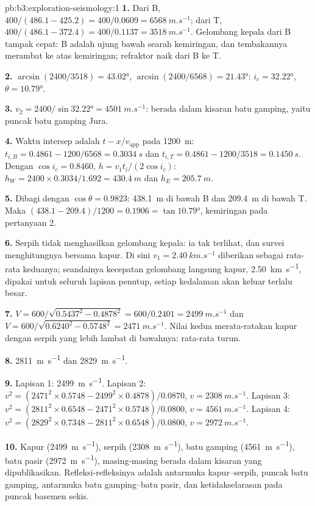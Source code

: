 \begin{solution}{pb:b3:exploration-seismology:1}
\textbf{1.} Dari B, $400/(486.1 - 425.2) = 400/0.0609 = \qty{6568}{m.s^{-1}}$;
dari T, $400/(486.1 - 372.4) = 400/0.1137 = \qty{3518}{m.s^{-1}}$. Gelombang kepala
dari B tampak cepat: B adalah ujung bawah searah kemiringan, dan tembakannya merambat ke atas kemiringan;
refraktor naik dari B ke T.

\textbf{2.} $\arcsin(2400/3518) = \ang{43.02}$, $\arcsin(2400/6568) =
\ang{21.43}$: $i_c = \ang{32.22}$, $\theta = \ang{10.79}$.

\textbf{3.} $v_2 = 2400/\sin\ang{32.22} = \qty{4501}{m.s^{-1}}$: berada dalam
kisaran batu gamping, yaitu puncak batu gamping Jura.

\textbf{4.} Waktu intersep adalah $t - x/v_{\text{app}}$ pada \qty{1200}{m}:
$t_{i,B} = 0.4861 - 1200/6568 = \qty{0.3034}{s}$ dan $t_{i,T} = 0.4861 -
1200/3518 = \qty{0.1450}{s}$. Dengan $\cos i_c = 0.8460$, $h = v_1t_i/(2\cos
i_c)$: $h_W = 2400\times0.3034/1.692 = \qty{430.4}{m}$ dan $h_E =
\qty{205.7}{m}$.

\textbf{5.} Dibagi dengan $\cos\theta = 0.9823$: \qty{438.1}{m} di bawah B dan
\qty{209.4}{m} di bawah T. Maka $(438.1 - 209.4)/1200 = 0.1906 =
\tan\ang{10.79}$, kemiringan pada pertanyaan 2.

\textbf{6.} Serpih tidak menghasilkan gelombang kepala: ia tak terlihat, dan survei
menghitungnya bersama kapur. Di sini $v_1 = \qty{2.40}{km.s^{-1}}$ diberikan sebagai
rata-rata keduanya; seandainya kecepatan gelombang langsung kapur, \qty{2.50}{km.s^{-1}},
dipakai untuk seluruh lapisan penutup, setiap kedalaman akan keluar terlalu besar.

\textbf{7.} $V = 600/\sqrt{0.5437^2 - 0.4878^2} = 600/0.2401 =
\qty{2499}{m.s^{-1}}$ dan $V = 600/\sqrt{0.6240^2 - 0.5748^2} =
\qty{2471}{m.s^{-1}}$. Nilai kedua merata-ratakan kapur dengan serpih yang lebih lambat
di bawahnya: rata-rata turun.

\textbf{8.} \qty{2811}{m.s^{-1}} dan \qty{2829}{m.s^{-1}}.

\textbf{9.} Lapisan 1: \qty{2499}{m.s^{-1}}. Lapisan 2: $v^2 = (2471^2\times0.5748
- 2499^2\times0.4878)/0.0870$, $v = \qty{2308}{m.s^{-1}}$. Lapisan 3:
$v^2 = (2811^2\times0.6548 - 2471^2\times0.5748)/0.0800$,
$v = \qty{4561}{m.s^{-1}}$. Lapisan 4: $v^2 = (2829^2\times0.7348 -
2811^2\times0.6548)/0.0800$, $v = \qty{2972}{m.s^{-1}}$.

\textbf{10.} Kapur (\qty{2499}{m.s^{-1}}), serpih (\qty{2308}{m.s^{-1}}),
batu gamping (\qty{4561}{m.s^{-1}}), batu pasir (\qty{2972}{m.s^{-1}}), masing-masing berada dalam
kisaran yang dipublikasikan. Refleksi-refleksinya adalah antarmuka kapur--serpih, puncak
batu gamping, antarmuka batu gamping--batu pasir, dan ketidakselarasan pada
puncak basemen sekis.


\end{solution}

